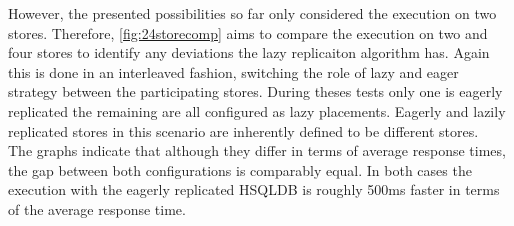 However, the presented possibilities so far only considered the execution on two stores. Therefore, \ref{fig:24storecomp} aims
to compare the execution on two and four stores to identify any deviations the lazy replicaiton algorithm has. 
Again this is done in an interleaved fashion, switching the role of lazy and eager strategy between the participating stores.
During theses tests only one is eagerly replicated the remaining are all configured as lazy placements. Eagerly and lazily replicated stores
in this scenario are inherently defined to be different stores.\\
The graphs indicate that although they differ in terms of average response times, the gap between both configurations is comparably equal.
In both cases the execution with the eagerly replicated HSQLDB is roughly 500ms faster in terms of the average response time.\\


